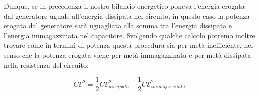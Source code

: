 Dunque, se in precedenza il nostro bilancio energetico poneva l'energia erogata dal generatore uguale all'energia dissipata nel circuito, in questo caso la potenza erogata dal generatore sarà uguagliata alla somma tra l'energia dissipata e l'energia immagazzinata nel capacitore. Svolgendo qualche calcolo potremo inoltre trovare come in termini di potenza questa procedura sia per metà inefficiente, nel senso che la potenza erogata viene per metà immagazzinata e per metà dissipata nella resistenza del circuito: 

$$ C\mathcal{E}^2 = \frac{1}{2} C\mathcal{E}^2_{dissipata}+ \frac{1}{2}C\mathcal{E}^2_{immagazzinata} $$